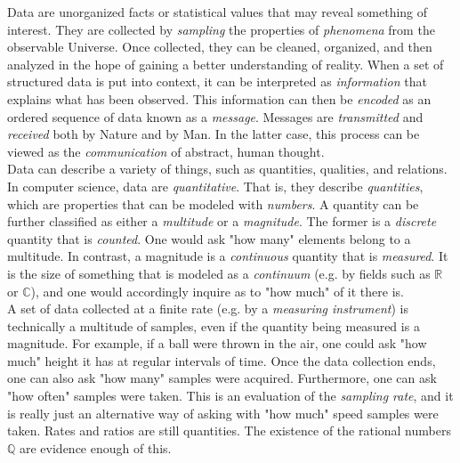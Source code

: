 

Data are unorganized facts or statistical values that may reveal something of interest. They are collected by \textit{sampling} the properties of \textit{phenomena} from the observable Universe. Once collected, they can be cleaned, organized, and then analyzed in the hope of gaining a better understanding of reality. When a set of structured data is put into context, it can be interpreted as \textit{information} that explains what has been observed. This information can then be \textit{encoded} as an ordered sequence of data known as a \textit{message}. Messages are \textit{transmitted} and \textit{received} both by Nature and by Man. In the latter case, this process can be viewed as the \textit{communication} of abstract, human thought. \\

Data can describe a variety of things, such as quantities, qualities, and relations. In computer science, data are \textit{quantitative}. That is, they describe \textit{quantities}, which are properties that can be modeled with \textit{numbers}. A quantity can be further classified as either a \textit{multitude} or a \textit{magnitude}. The former is a \textit{discrete} quantity that is \textit{counted}. One would ask "how many" elements belong to a multitude. In contrast, a magnitude is a \textit{continuous} quantity that is \textit{measured}. It is the size of something that is modeled as a \textit{continuum} (e.g. by fields such as $\mathbb{R}$ or $\mathbb{C}$), and one would accordingly inquire as to "how much" of it there is. \\

A set of data collected at a finite rate (e.g. by a \textit{measuring instrument}) is technically a  multitude of samples, even if the quantity being measured is a magnitude. For example, if a ball were thrown in the air, one could ask "how much" height it has at regular intervals of time. Once the data collection ends, one can also ask "how many" samples were acquired. Furthermore, one can ask "how often" samples were taken. This is an evaluation of the \textit{sampling rate}, and it is really just an alternative way of asking with "how much" speed samples were taken. Rates and ratios are still quantities. The existence of the rational numbers $\mathbb{Q}$ are evidence enough of this. \\

